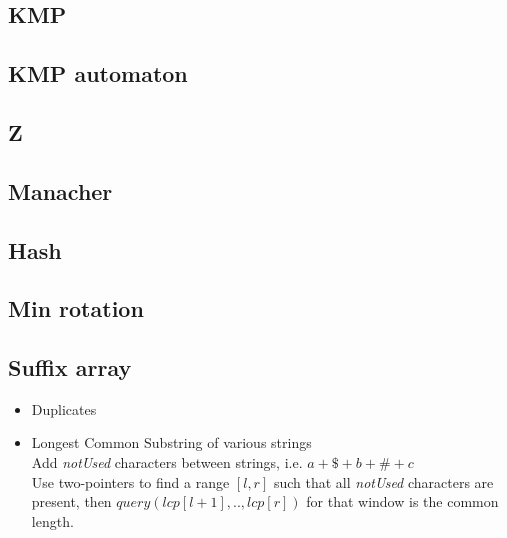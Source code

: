 
\subsection{KMP }

\subsection{KMP automaton }

\subsection{Z }

\subsection{Manacher }

\subsection{Hash }


\subsection{Min rotation }

\subsection{Suffix array }

\begin{itemize}[noitemsep]
  \item Duplicates 

  \item Longest Common Substring of various strings \\
  Add \emph{notUsed} characters between strings, i.e. $a + \$ + b + \# + c$ \\ 
  Use two-pointers to find a range $[l, r]$ such that all \emph{notUsed} characters are present, then $query(lcp[l + 1],..,lcp[r])$ for that window is the common length. \\

\end{itemize}

